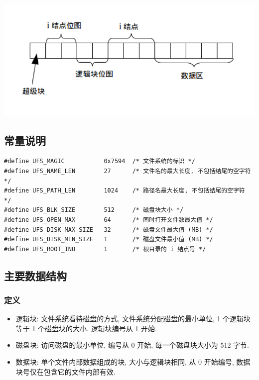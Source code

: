 \documentclass[nofonts, titlepage]{ctexart}
\begin{document}
\begin{center}
\includegraphics[width=14cm]{./images/./layout.png}
\label{fig:layout}
\end{center}

\subsection{常量说明}\label{ux5e38ux91cfux8bf4ux660e}

\begin{verbatim}
#define UFS_MAGIC           0x7594  /* 文件系统的标识 */
#define UFS_NAME_LEN        27      /* 文件名的最大长度, 不包括结尾的空字符 */
#define UFS_PATH_LEN        1024    /* 路径名最大长度, 不包括结尾的空字符 */
#define UFS_BLK_SIZE        512     /* 磁盘块大小 */
#define UFS_OPEN_MAX        64      /* 同时打开文件数最大值 */
#define UFS_DISK_MAX_SIZE   32      /* 磁盘文件最大值 (MB) */
#define UFS_DISK_MIN_SIZE   1       /* 磁盘文件最小值 (MB) */
#define UFS_ROOT_INO        1       /* 根目录的 i 结点号 */
\end{verbatim}

\subsection{主要数据结构}\label{ux4e3bux8981ux6570ux636eux7ed3ux6784}

\subsubsection{定义}\label{ux5b9aux4e49-1}

\begin{itemize}
\item
  逻辑块: 文件系统看待磁盘的方式, 文件系统分配磁盘的最小单位, 1
  个逻辑块等于 1 个磁盘块的大小. 逻辑块编号从 1 开始.
\item
  磁盘块: 访问磁盘的最小单位, 编号从 0 开始, 每一个磁盘块大小为 512
  字节.
\item
  数据块: 单个文件内部数据组成的块, 大小与逻辑块相同, 从 0 开始编号,
  数据块号仅在包含它的文件内部有效.
\end{itemize}
\end{document}
